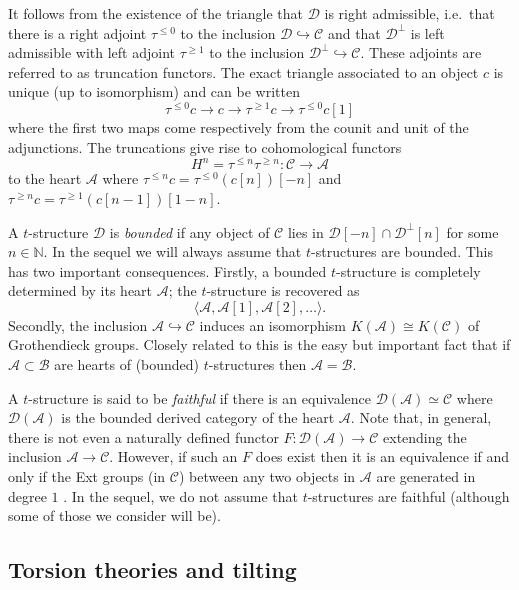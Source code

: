 \documentclass{article}
\theoremstyle{plain}
\theoremstyle{definition}
\theoremstyle{remark}
\newcommand{\defn}[1]{\emph{#1}}
\newcommand{\ie}{i.e.\ }
\newcommand{\N}{\mathbb{N}}
\newcommand{\cat}[1]{\mathcal{#1}}
\begin{document}
 It follows from the existence of the triangle that $\cat{D}$ is right admissible, \ie that there is a right adjoint $\tau^{\leq 0}$ to the inclusion $\cat{D} \hookrightarrow \cat{C}$ and that $\cat{D}^\perp$ is left admissible with left adjoint $\tau^{\geq 1}$ to the inclusion $\cat{D}^\perp \hookrightarrow \cat{C}$. These adjoints are referred to as truncation functors. The exact triangle associated to an object $c$ is unique (up to isomorphism) and can be written 
$$
\tau^{\leq 0}c \to c \to \tau^{\geq 1}c \to \tau^{\leq 0}c [1]
$$
where the first two maps come respectively from the counit and unit of the adjunctions. The truncations give rise to cohomological functors $$H^n = \tau^{\leq n}\tau^{\geq n}: \cat{C} \to \cat{A}$$ to the heart $\cat{A}$ where $\tau^{\leq n} c = \tau^{\leq 0} (c[n])[-n]$ and $\tau^{\geq n} c = \tau^{\geq 1} (c[n-1])[1-n]$.

A $t$-structure $\cat{D}$ is \defn{bounded} if any object of $\cat{C}$ lies in $\cat{D}[-n] \cap \cat{D}^\perp[n]$ for some $n\in \N$. In the sequel we will always assume that $t$-structures are bounded. This has two important consequences. Firstly, a bounded $t$-structure is completely determined by its heart $\cat{A}$; the $t$-structure is recovered as 
$$
\langle \cat{A}, \cat{A}[1] , \cat{A}[2] , \ldots \rangle.
$$
Secondly, the inclusion $\cat{A} \hookrightarrow \cat{C}$ induces an isomorphism $K(\cat{A}) \cong K(\cat{C})$ of Grothendieck groups. Closely related to this is the easy but important fact that if $\cat{A} \subset \cat{B}$ are hearts of (bounded) $t$-structures then $\cat{A}=\cat{B}$.

A $t$-structure is said to be \defn{faithful} if there is an equivalence $\cat{D}(\cat{A}) \simeq \cat{C}$
where $\cat{D}(\cat{A})$ is the bounded derived category of the heart $\cat{A}$. Note that, in general, there is not even a naturally defined functor $F: \cat{D}(\cat{A}) \to \cat{C}$ extending the inclusion $\cat{A} \to \cat{C}$. However, if such an $F$ does exist then it is an equivalence if and only if the Ext groups (in $\cat{C}$) between any two objects in $\cat{A}$ are generated in degree $1$ \cite[Chapter 5, Theorem 3.7.3]{gema}.  In the sequel, we do not assume that $t$-structures are faithful (although some of those we consider will be).


\subsection{Torsion theories and tilting}
\label{tilting}
\end{document}
